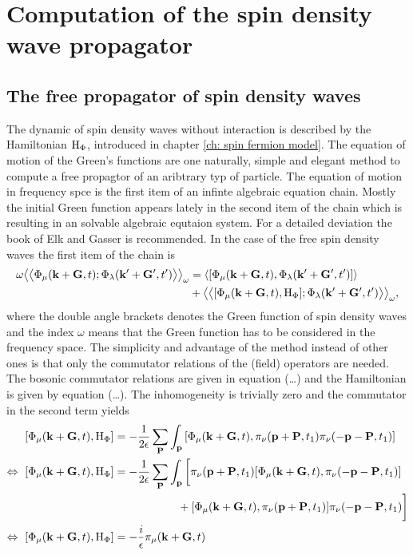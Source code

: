%
%
%
\chapter{Computation of the spin density wave propagator}
\label{ch: propagator}
%
%
%
%
%
\section{The free propagator of spin density waves}
\label{sec: free propagator}
%
%
The dynamic of spin density waves without interaction is described by the Hamiltonian $\mathrm{H}_{\Phi}$, introduced in chapter \ref{ch: spin fermion model}.
The equation of motion of the Green's functions are one naturally, simple and elegant method to compute a free propagtor of an aribtrary typ of particle.
The equation of motion in frequency spce is the first item of an infinte algebraic equation chain.
Mostly the initial Green function appears lately in the second item of the chain which is resulting in an solvable algebraic equtaion system.
For a detailed deviation the book of Elk and Gasser \cite{Elk&Gasser} is recommended.
In the case of the free spin density waves the first item of the chain is
%
\begin{align}
	\omega \green{\Phi_{\mu}(\vb{k}+\vb{G},t)}{\Phi_{\lambda}(\vb{k}'+\vb{G}',t')}_{\omega} &= 
		\expval{\comm{\Phi_{\mu}(\vb{k}+\vb{G},t)}{\Phi_{\lambda}(\vb{k}'+\vb{G}',t')}}
		\notag \\ &+
		\green{\comm{\Phi_{\mu}(\vb{k}+\vb{G},t)}{\mt{H}_{\Phi}}}{\Phi_{\lambda}(\vb{k}'+\vb{G}',t')}_{\omega},
	\label{eq: first item of equation chain}
\end{align}
%
where the double angle brackets denotes the Green function of spin density waves and the index $\omega$ means that the Green function has to be considered in the frequency space.
The simplicity and advantage of the method instead of other ones is that only the commutator relations of the (field) operators are needed.
The bosonic commutator relations are given in equation (\dots{}) and the Hamiltonian is given by equation (\dots{}).
The inhomogeneity is trivially zero and the commutator in the second term yields
%
\begin{align}
	\comm{\Phi_{\mu}(\vb{k}+\vb{G},t)}{\mt{H}_{\Phi}} &= 
		-\frac{1}{2\epsilon} 
		\sum\limits_{\vb{P}} 
		\int_{\vb{p}}
		\comm{\Phi_{\mu}(\vb{k}+\vb{G},t)}{\pi_{\nu}(\vb{p}+\vb{P},t_{1}) \pi_{\nu}(-\vb{p}-\vb{P},t_{1})}
	\notag \\
	\Leftrightarrow\ \comm{\Phi_{\mu}(\vb{k}+\vb{G},t)}{\mt{H}_{\Phi}} &= 
		-\frac{1}{2\epsilon} 
		\sum\limits_{\vb{P}} 
		\int_{\vb{p}} \bigg[
			\pi_{\nu}(\vb{p}+\vb{P},t_{1}) \comm{\Phi_{\mu}(\vb{k}+\vb{G},t)}{\pi_{\nu}(-\vb{p}-\vb{P},t_{1})}
			\notag \\& \hspace{2cm}
			+
			\comm{\Phi_{\mu}(\vb{k}+\vb{G},t)}{\pi_{\nu}(\vb{p}+\vb{P},t_{1})} \pi_{\nu}(-\vb{p}-\vb{P},t_{1})
		\bigg]
	\notag \\
	\Leftrightarrow\ \comm{\Phi_{\mu}(\vb{k}+\vb{G},t)}{\mt{H}_{\Phi}} &= 
		-\frac{i}{\epsilon} \pi_{\mu}(\vb{k}+\vb{G},t)
\end{align}
